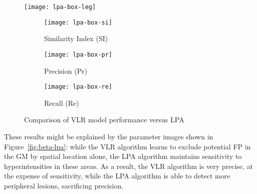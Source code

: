 \begin{figure}
  \centering
  \texttt{[image: lpa-box-leg]}\\[0.5em]
  \begin{subfigure}{0.32\textwidth}
    \centering
    \texttt{[image: lpa-box-si]}
    \caption{Similarity Index (SI)}%
    \label{fig:seg-lpa-si}
  \end{subfigure}
  \begin{subfigure}{0.32\textwidth}
    \centering
    \texttt{[image: lpa-box-pr]}
    \caption{Precision (Pr)}%
    \label{fig:seg-lpa-pr}
  \end{subfigure}
  \begin{subfigure}{0.32\textwidth}
    \centering
    \texttt{[image: lpa-box-re]}
    \caption{Recall (Re)}%
    \label{fig:seg-lpa-re}
  \end{subfigure}
  \caption{Comparison of VLR model performance versus LPA}%
  \label{fig:seg-lpa}
\end{figure}
These results might be explained by the parameter images shown in Figure~\ref{fig:beta-lpa}:
while the VLR algorithm learns to exclude potential FP in the GM by spatial location alone,
the LPA algorithm maintains sensitivity to hyperintensities in these areas.
As a result, the VLR algorithm is very precise, at the expense of sensitivity,
while the LPA algorithm is able to detect more peripheral lesions, sacrificing precision.
